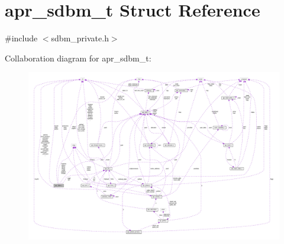 \hypertarget{structapr__sdbm__t}{}\section{apr\+\_\+sdbm\+\_\+t Struct Reference}
\label{structapr__sdbm__t}


{\ttfamily \#include $<$sdbm\+\_\+private.\+h$>$}



Collaboration diagram for apr\+\_\+sdbm\+\_\+t\+:
\nopagebreak
\begin{figure}[H]
\begin{center}
\leavevmode
\includegraphics[width=350pt]{structapr__sdbm__t__coll__graph}
\end{center}
\end{figure}
